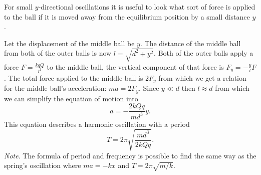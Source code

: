 \hinteng
For small $y$-directional oscillations it is useful to look what sort of force is applied to the ball if it is moved away from the equilibrium position by a small distance $y$.

\solueng
Let the displacement of the middle ball be $y$. The distance of the middle ball from both of the outer balls is now $l=\sqrt{d^2+y^2}$. Both of the outer balls apply a force $F=\frac{kqQ}{l^2}$ to the middle ball, the vertical component of that force is $F_y=-\frac{y}{l}F$. The total force applied to the middle ball is $2F_y$ from which we get a relation for the middle ball’s acceleration: $ma=2F_y$. Since $y\ll d$ then $l\approx d$ from which we can simplify the equation of motion into
\[
a=-\frac{2kQq}{md^3}y.
\] 
This equation describes a harmonic oscillation with a period
\[ T = 2\pi \sqrt{\frac{md^3}{2kQq}}.\] 
\emph{Note}. The formula of period and frequency is possible to find the same way as the spring’s oscillation where $ma = -kx$ and $T=2\pi \sqrt{m/k}$.
\probend